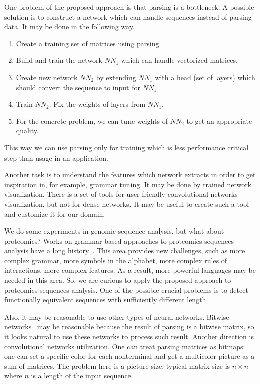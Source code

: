\documentclass[a4paper,twoside]{article}
\begin{document}
One problem of the proposed approach is that parsing is a bottleneck.
A possible solution is to construct a network which can handle sequences instead of parsing data.
It may be done in the following way.
\begin{enumerate}
\item Create a training set of matrices using parsing.
\item Build and train the network $NN_1$ which can handle vectorized matrices.
\item Create new network $NN_2$ by extending $NN_1$ with a head (set of layers) which should convert the sequence to input for $NN_1$
\item Train $NN_2$. Fix the weights of layers from $NN_1$.
\item For the concrete problem, we can tune weights of $NN_2$ to get an appropriate quality.
\end{enumerate}
This way we can use parsing only for training which is less performance critical step than usage in an application.

Another task is to understand the features which network extracts in order to get inspiration in, for example, grammar tuning.
It may be done by trained network visualization.
There is a set of tools for user-friendly convolutional networks visualization, but not for dense networks.
It may be useful to create such a tool and customize it for our domain.

We do some experiments in genomic sequence analysis, but what about proteomics?
Works on grammar-based approaches to proteomics sequences analysis have a long history~\cite{Jimenez-Montano1984,Dyrka2008ASC,Sciacca2011AnnotatedSC}.
This area provides new challenges, such as more complex grammar, more symbols in the alphabet, more complex rules of interactions, more complex features.
As a result, more powerful languages may be needed in this area.
So, we are curious to apply the proposed approach to proteomics sequences analysis.
One of the possible crucial problems is to detect functionally equivalent sequences with sufficiently different length.

Also, it may be reasonable to use other types of neural networks.
Bitwise networks~\cite{DBLP:journals:corr:KimS16} may be reasonable because the result of parsing is a bitwise matrix, so it looks natural to use these networks to process such result. 
Another direction is convolutional networks utilization.
One can treat parsing matrices as bitmaps: one can set a specific color for each nonterminal and get a multicolor picture as a sum of matrices.
The problem here is a picture size: typical matrix size is $n \times n$ where $n$ is a length of the input sequence.
\end{document}
